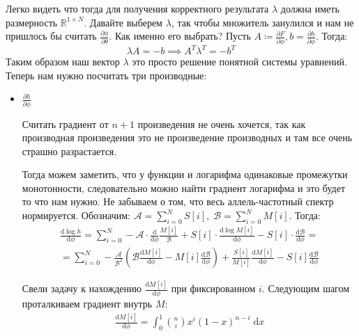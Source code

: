 \documentclass[10pt]{article}
\theoremstyle{plain}
\theoremstyle{remark}
\newcommand{\R}{\mathbb{R}}
\begin{document}
Легко видеть что тогда для получения корректного результата $\lambda$ должна иметь размерность $\R^{1 \times N}$.
Давайте выберем $\lambda$, так чтобы множитель занулился и нам не пришлось бы считать $\frac{\partial \phi}{\partial \theta}$. Как именно его выбрать?
Пусть $A \coloneqq \frac{\partial F}{\partial \phi}, b = \frac{\partial h}{\partial \phi}$. Тогда:
\begin{equation*}
  \lambda A = -b \implies A^T \lambda^T = -b^T
\end{equation*}
Таким образом наш вектор $\lambda$ это просто решение понятной системы уравнений. Теперь нам нужно посчитать три производные:

\begin{itemize}
  \item $\boxed{\frac{\partial h}{\partial \phi}}$

  Считать градиент от $n + 1$  произведения не очень хочется, так как производная произведения это не
  произведение производных и там все очень страшно разрастается.

  Тогда можем заметить, что у функции и логарифма одинаковые промежутки монотонности, следовательно можно найти градиент логарифма и это будет то что нам нужно.
  Не забываем о том, что весь аллель-частотный спектр нормируется. Обозначим: $\mathcal{A} = \sum_{i = 0}^N S[i],\; \mathcal{B} = \sum_{i = 0}^N M[i]$. Тогда:
  \begin{gather*}
    \frac{\mathrm{d} \log h}{\mathrm{d} \phi} = \sum_{i = 0}^N -\mathcal{A} \cdot \frac{\mathrm{d}}{\mathrm{d}\phi} \frac{M[i]}{\mathcal{B}} + 
    S[i] \cdot \frac{\mathrm{d} \log M[i]}{\mathrm{d} \phi} - S[i] \cdot \frac{\mathrm{d}\mathcal{B}}{\mathrm{d}\phi} = \\ =
    \sum_{i = 0}^N -\frac{\mathcal{A}}{\mathcal{B}^2} \left(\mathcal{B} \frac{\mathrm{d} M[i]}{\mathrm{d} \phi} - M[i] \frac{\mathrm{d} \mathcal{B}}{\mathrm{d}\phi} \right) +
    \frac{S[i]}{M[i]} \frac{\mathrm{d}M[i]}{\mathrm{d}\phi} - S[i] \frac{\mathrm{d} \mathcal{B}}{\mathrm{d}\phi}
  \end{gather*}
  
  Свели задачу к нахождению $\frac{\mathrm{d} M[i]}{\mathrm{d} \phi}$ при фиксированном  $i$. Следующим шагом проталкиваем градиент внутрь $M$:
  \begin{gather*}
    \frac{\mathrm{d} M[i]}{\mathrm{d} \phi} = 
    \int_0^1
    \binom{n}{i} x^{i} (1 - x)^{n - i}  \; \mathrm{d}x
  \end{gather*}
  

\end{itemize}
\end{document}
